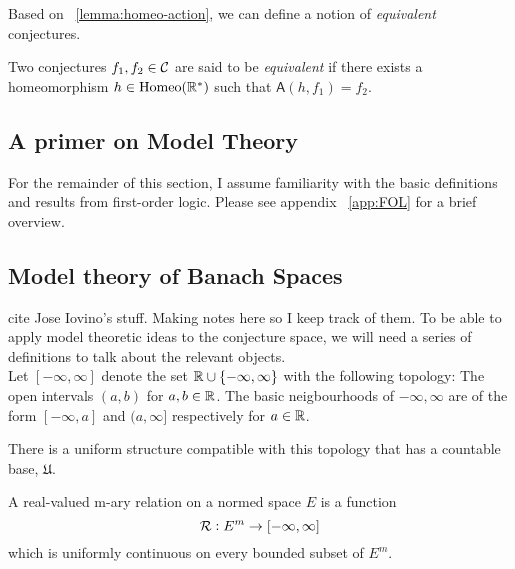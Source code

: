 Based on ~\ref{lemma:homeo-action}, we can define a notion of \textit{equivalent} conjectures.
\begin{definition}
    Two conjectures $f_1,f_2\in\mathcal{C}$ are said to be \textit{equivalent} if there exists a homeomorphism $h\in\text{Homeo}(\mathbb{R}^*)$ such that $\mathsf{A}(h, f_1) = f_2$.

\subsection{A primer on Model Theory}
For the remainder of this section, I assume familiarity with the basic definitions and results from first-order logic. Please see appendix ~\ref{app:FOL} for a brief overview.
\subsection{Model theory of Banach Spaces}
cite Jose Iovino's stuff. Making notes here so I keep track of them.
To be able to apply model theoretic ideas to the conjecture space, we will need a series of definitions to talk about the relevant objects.\\

Let $[-\infty, \infty]$ denote the set $\mathbb{R}\cup\{-\infty, \infty\}$ with the following topology: The open intervals $(a,b)$ for $a,b\in \mathbb{R}$. The basic neigbourhoods of $-\infty, \infty$ are of the form $[-\infty, a]$ and $(a,\infty]$ respectively for $a\in \mathbb{R}$.
\begin{remark}
    There is a uniform structure compatible with this topology that has a countable base, $\mathfrak{U}$.
\end{remark}

\begin{definition}
    A real-valued m-ary relation on a normed space $E$ is a function
    \begin{equation*}
        \mathcal{R}:E^m\rightarrow [-\infty, \infty]
    \end{equation*}
    which is uniformly continuous on every bounded subset of $E^m$.    
\end{definition}


\end{definition}

